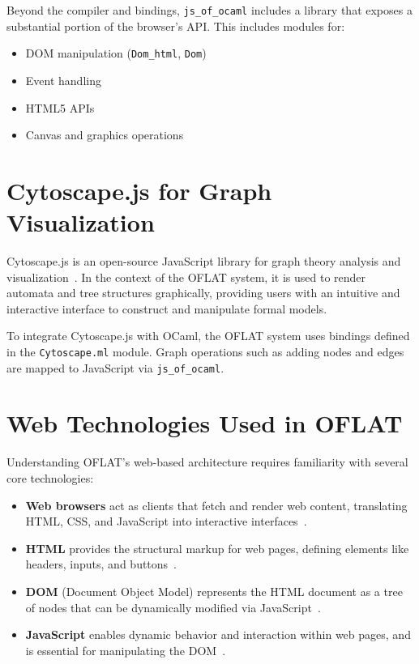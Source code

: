 Beyond the compiler and bindings, \texttt{js\_of\_ocaml} includes a library that exposes a substantial portion of the browser's API. 
This includes modules for:
\begin{itemize}
  \item DOM manipulation (\texttt{Dom\_html}, \texttt{Dom})
  \item Event handling
  \item HTML5 APIs
  \item Canvas and graphics operations
\end{itemize}


\section{Cytoscape.js for Graph Visualization}

Cytoscape.js is an open-source JavaScript library for graph theory analysis and visualization~\cite{cytoscape}. 
In the context of the OFLAT system, it is used to render automata and tree structures graphically, 
providing users with an intuitive and interactive interface to construct and manipulate formal models. 

To integrate Cytoscape.js with OCaml, the OFLAT system uses bindings defined in the \texttt{Cytoscape.ml} module. 
Graph operations such as adding nodes and edges are mapped to JavaScript via \texttt{js\_of\_ocaml}.

\section{Web Technologies Used in OFLAT}

Understanding OFLAT's web-based architecture requires familiarity with several core technologies:
\begin{itemize}
    \item \textbf{Web browsers} act as clients that fetch and render web content, translating HTML, CSS, and JavaScript into interactive interfaces~\cite{webbrowsers}.
    \item \textbf{HTML} provides the structural markup for web pages, defining elements like headers, inputs, and buttons~\cite{html}.
    \item \textbf{DOM} (Document Object Model) represents the HTML document as a tree of nodes that can be dynamically modified via JavaScript~\cite{dom}.
    \item \textbf{JavaScript} enables dynamic behavior and interaction within web pages, and is essential for manipulating the DOM~\cite{javascript}.
\end{itemize}


